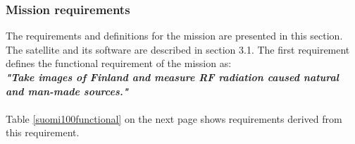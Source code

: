 \documentclass[english,12pt,a4paper,pdftex,elec,utf8]{aaltothesis}
\begin{document}
\subsubsection{Mission requirements} 
The requirements and definitions for the mission are presented in this section. The satellite and its software are described in section 3.1. The first requirement defines the functional requirement of the mission as: 
\\
\textbf{\textit{"Take images of Finland and measure RF radiation caused natural and man-made sources."}}
\\
\\
Table \ref{suomi100functional} on the next page shows requirements derived from this requirement.
\end{document}
